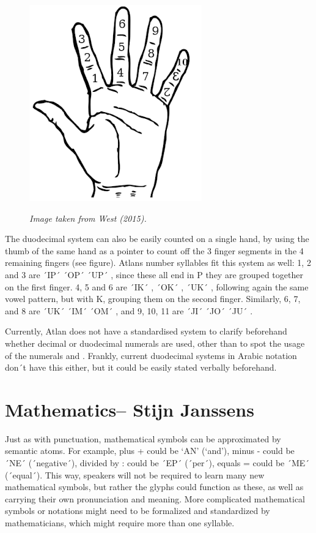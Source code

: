 \pagebreak
\begin{figure}
\includegraphics[scale=0.4]{./Images/Hand.jpeg}

	{\it \footnotesize Image taken from West (2015). }
\end{figure}

The duodecimal system can also be easily counted on a single hand, by using the thumb of the same hand as a pointer to count off the 3 finger segments in the 4 remaining fingers (see figure). Atlans number syllables fit this system as well: 1, 2 and 3 are ´IP´ \ip ´OP´ \op ´UP´ \up, since these all end in P they are grouped together on the first finger. 4, 5 and 6 are ´IK´ \raisebox{-0.5em}{\ik} , ´OK´ \raisebox{-0.5em}{\ok}, ´UK´ \raisebox{-0.5em}{\uk}, following again the same vowel pattern, but with K, grouping them on the second finger. Similarly, 6, 7, and 8 are ´UK´ \uk ´IM´ \im ´OM´ \om, and 9, 10, 11 are ´JI´ \ji ´JO´ \jo ´JU´ \ju. 

Currently, Atlan does not have a standardised system to clarify beforehand whether decimal or duodecimal numerals are used, other than to spot the usage of the numerals  and . Frankly, current duodecimal systems in Arabic notation don´t have this either, but it could be easily stated verbally beforehand.  

 

\section{Mathematics-- {\small Stijn Janssens}}

Just as with punctuation, mathematical symbols can be approximated by semantic atoms. For example, plus + could be ‘AN’ \an (‘and’), minus - could be ´NE´ \ne (´negative´), divided by : could be ´EP´ \raisebox{-0.5em}{\ep} (´per´), equals = could be ´ME´ \raisebox{-0.3em}{\me} (´equal´). This way, speakers will not be required to learn many new mathematical symbols, but rather the glyphs could function as these, as well as carrying their own pronunciation and meaning. More complicated mathematical symbols or notations might need to be formalized and standardized by mathematicians, which might require more than one syllable. 




